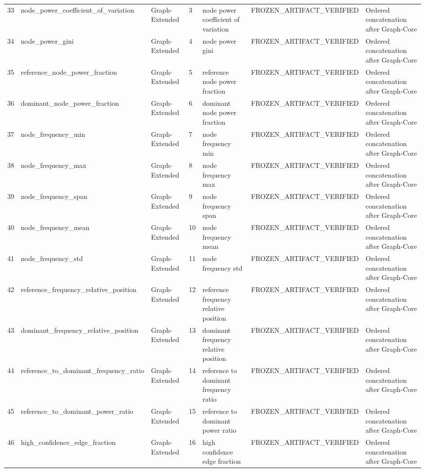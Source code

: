 \begin{longtable}{lllllll}
33 & node\_power\_coefficient\_of\_variation & Graph-Extended & 3 & node power coefficient of variation & FROZEN\_ARTIFACT\_VERIFIED & Ordered concatenation after Graph-Core \\
34 & node\_power\_gini & Graph-Extended & 4 & node power gini & FROZEN\_ARTIFACT\_VERIFIED & Ordered concatenation after Graph-Core \\
35 & reference\_node\_power\_fraction & Graph-Extended & 5 & reference node power fraction & FROZEN\_ARTIFACT\_VERIFIED & Ordered concatenation after Graph-Core \\
36 & dominant\_node\_power\_fraction & Graph-Extended & 6 & dominant node power fraction & FROZEN\_ARTIFACT\_VERIFIED & Ordered concatenation after Graph-Core \\
37 & node\_frequency\_min & Graph-Extended & 7 & node frequency min & FROZEN\_ARTIFACT\_VERIFIED & Ordered concatenation after Graph-Core \\
38 & node\_frequency\_max & Graph-Extended & 8 & node frequency max & FROZEN\_ARTIFACT\_VERIFIED & Ordered concatenation after Graph-Core \\
39 & node\_frequency\_span & Graph-Extended & 9 & node frequency span & FROZEN\_ARTIFACT\_VERIFIED & Ordered concatenation after Graph-Core \\
40 & node\_frequency\_mean & Graph-Extended & 10 & node frequency mean & FROZEN\_ARTIFACT\_VERIFIED & Ordered concatenation after Graph-Core \\
41 & node\_frequency\_std & Graph-Extended & 11 & node frequency std & FROZEN\_ARTIFACT\_VERIFIED & Ordered concatenation after Graph-Core \\
42 & reference\_frequency\_relative\_position & Graph-Extended & 12 & reference frequency relative position & FROZEN\_ARTIFACT\_VERIFIED & Ordered concatenation after Graph-Core \\
43 & dominant\_frequency\_relative\_position & Graph-Extended & 13 & dominant frequency relative position & FROZEN\_ARTIFACT\_VERIFIED & Ordered concatenation after Graph-Core \\
44 & reference\_to\_dominant\_frequency\_ratio & Graph-Extended & 14 & reference to dominant frequency ratio & FROZEN\_ARTIFACT\_VERIFIED & Ordered concatenation after Graph-Core \\
45 & reference\_to\_dominant\_power\_ratio & Graph-Extended & 15 & reference to dominant power ratio & FROZEN\_ARTIFACT\_VERIFIED & Ordered concatenation after Graph-Core \\
46 & high\_confidence\_edge\_fraction & Graph-Extended & 16 & high confidence edge fraction & FROZEN\_ARTIFACT\_VERIFIED & Ordered concatenation after Graph-Core \\

\end{longtable}
